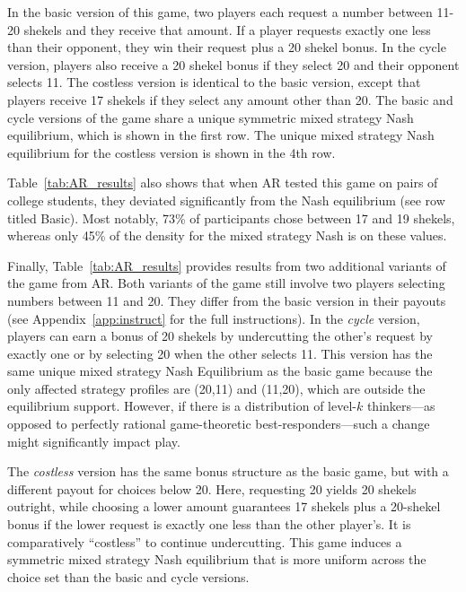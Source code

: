 \documentclass[11pt]{article}
\theoremstyle{definition}
\begin{document}
\begin{table}[h!]
\begin{footnotesize}
\begin{singlespace}
In the basic version of this game, two players each request a number between 11-20 shekels and they receive that amount. 
If a player requests exactly one less than their opponent, they win their request plus a 20 shekel bonus. 
In the cycle version, players also receive a 20 shekel bonus if they select 20 and their opponent selects 11. 
The costless version is identical to the basic version, except that players receive 17 shekels if they select any amount other than 20.
The basic and cycle versions of the game share a unique symmetric mixed strategy Nash equilibrium, which is shown in the first row.
The unique mixed strategy Nash equilibrium for the costless version is shown in the 4th row.
\end{singlespace}
\end{footnotesize}
\end{table}

Table~\ref{tab:AR_results} also shows that when AR tested this game on pairs of college students, they deviated significantly from the Nash equilibrium (see row titled Basic).
Most notably, 73\% of participants chose between 17 and 19 shekels, whereas only 45\% of the density for the mixed strategy Nash is on these values.

Finally, Table~\ref{tab:AR_results} provides results from two additional variants of the game from AR.
Both variants of the game still involve two players selecting numbers between 11 and 20.
They differ from the basic version in their payouts (see Appendix~\ref{app:instruct} for the full instructions).
In the \emph{cycle} version, players can earn a bonus of 20 shekels by undercutting the other's request by exactly one or by selecting 20 when the other selects 11. 
This version has the same unique mixed strategy Nash Equilibrium as the basic game because the only affected strategy profiles are (20,11) and (11,20), which are outside the equilibrium support.
However, if there is a distribution of level-$k$ thinkers---as opposed to perfectly rational game-theoretic best-responders---such a change might significantly impact play.

The \emph{costless} version has the same bonus structure as the basic game, but with a different payout for choices below 20.
Here, requesting 20 yields 20 shekels outright, while choosing a lower amount guarantees 17 shekels plus a 20-shekel bonus if the lower request is exactly one less than the other player's. 
It is comparatively ``costless'' to continue undercutting.
This game induces a symmetric mixed strategy Nash equilibrium that is more uniform across the choice set than the basic and cycle versions.
\end{document}
